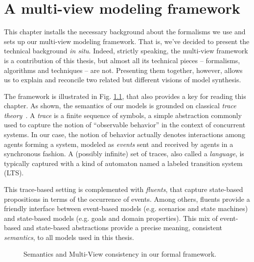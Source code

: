 \chapter{A multi-view modeling framework\label{chapter:framework}}

This chapter installs the necessary background about the formalisms we use and sets up our multi-view modeling framework. That is, we've decided to present the technical background \emph{in situ}. Indeed, strictly speaking, the multi-view framework is a contribution of this thesis, but almost all its technical pieces -- formalisms, algorithms and techniques -- are not. Presenting them together, however, allows us to explain and reconcile two related but different visions of model synthesis.

The framework is illustrated in Fig. \ref{image:framework}, that also provides a key for reading this chapter. As shown, the semantics of our models is grounded on classical \emph{trace theory}~\cite{Hoare:1985}. A \emph{trace} is a finite sequence of symbols, a simple abstraction commonly used to capture the notion of ``observable behavior'' in the context of concurrent systems. In our case, the notion of behavior actually denotes interactions among agents forming a system, modeled as \emph{events} sent and received by agents in a synchronous fashion. A (possibly infinite) set of traces, also called a \emph{language}, is typically captured with a kind of automaton named a labeled transition system (LTS).

This trace-based setting is complemented with \emph{fluents}, that capture state-based propositions in terms of the occurrence of events. Among others, fluents provide a friendly interface between event-based models (e.g. scenarios and state machines) and state-based models (e.g. goals and domain properties). This mix of event-based and state-based abstractions provide a precise meaning, consistent \emph{semantics}, to all models used in this thesis. 

\begin{figure}[t]\centering
  \caption{Semantics and Multi-View consistency in our formal framework.\label{image:framework}}
\end{figure}

